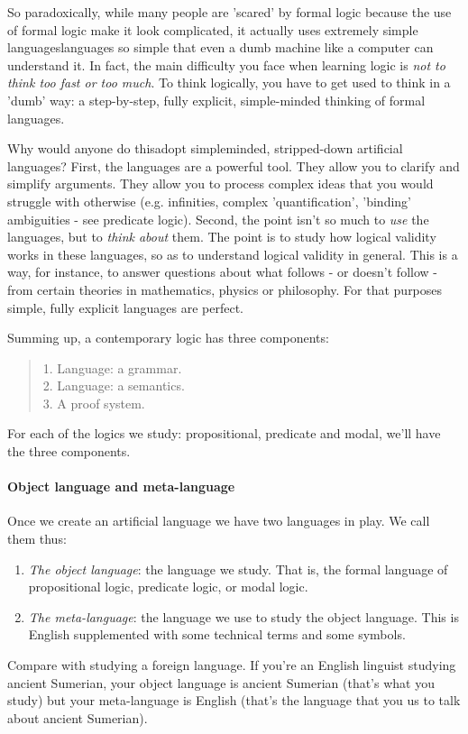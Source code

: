 \documentclass[../../../include/open-logic-part]{subfiles}
\begin{document}
So paradoxically, while many people are 'scared' by formal logic because
the use of formal logic make it look complicated, it actually uses
extremely simple languages\textemdash languages so simple that even
a dumb machine like a computer can understand it. In fact, the main
difficulty you face when learning logic is \emph{not to think too
fast or too much}. To think logically, you have to get used to think
in a 'dumb' way: a step-by-step, fully explicit, simple-minded thinking
of formal languages. 

Why would anyone do this\textemdash adopt simpleminded, stripped-down
artificial languages? First, the languages are a powerful tool. They
allow you to clarify and simplify arguments. They allow you to process
complex ideas that you would struggle with otherwise (e.g. infinities,
complex 'quantification', 'binding' ambiguities - see predicate logic).
Second, the point isn't so much to \emph{use} the languages, but to
\emph{think about }them. The point is to study how logical validity
works in these languages, so as to understand logical validity in
general. This is a way, for instance, to answer questions about what
follows - or doesn't follow - from certain theories in mathematics,
physics or philosophy. For that purposes simple, fully explicit languages
are perfect. 

Summing up, a contemporary logic has three components:
\begin{quote}
1. Language: a grammar.\\
2. Language: a semantics.\\
3. A proof system.
\end{quote}
For each of the logics we study: propositional, predicate and modal,
we'll have the three components. 

\paragraph{Object language and meta-language}

Once we create an artificial language we have two languages in play.
We call them thus:
\begin{enumerate}
\item \emph{The object language}: the language we study. That is, the formal
language of propositional logic, predicate logic, or modal logic.
\item \emph{The meta-language}: the language we use to study the object
language. This is English supplemented with some technical terms and
some symbols.
\end{enumerate}
Compare with studying a foreign language. If you're an English linguist
studying ancient Sumerian, your object language is ancient Sumerian
(that's what you study) but your meta-language is English (that's
the language that you us to talk about ancient Sumerian).
\end{document}
